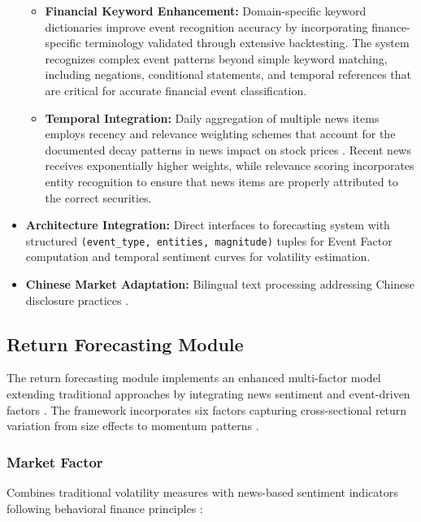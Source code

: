 \documentclass[3p,times,procedia]{elsarticle}
\begin{document}
\begin{itemize}
\begin{itemize}
\item \textbf{Financial Keyword Enhancement:} Domain-specific keyword dictionaries improve event recognition accuracy by incorporating finance-specific terminology validated through extensive backtesting. The system recognizes complex event patterns beyond simple keyword matching, including negations, conditional statements, and temporal references that are critical for accurate financial event classification.

\item \textbf{Temporal Integration:} Daily aggregation of multiple news items employs recency and relevance weighting schemes that account for the documented decay patterns in news impact on stock prices \cite{TETLOCK2007}. Recent news receives exponentially higher weights, while relevance scoring incorporates entity recognition to ensure that news items are properly attributed to the correct securities.
\end{itemize}

\item \textbf{Architecture Integration:} Direct interfaces to forecasting system with structured \texttt{(event\_type, entities, magnitude)} tuples for Event Factor computation and temporal sentiment curves for volatility estimation.

\item \textbf{Chinese Market Adaptation:} Bilingual text processing addressing Chinese disclosure practices \cite{FinReportDataset2025}.
\end{itemize}
\subsection{{Return Forecasting Module}}

The return forecasting module implements an enhanced multi-factor model extending traditional approaches \cite{FAMA1993,Carhart1997} by integrating news sentiment and event-driven factors \cite{Harvey2016,TETLOCK2007}. The framework incorporates six factors capturing cross-sectional return variation from size effects \cite{Banz1981} to momentum patterns \cite{Jegadeesh1993}.

\subsubsection{{Market Factor}}

Combines traditional volatility measures with news-based sentiment indicators following behavioral finance principles \cite{Daniel1998,Campbell2001}:
\end{document}
